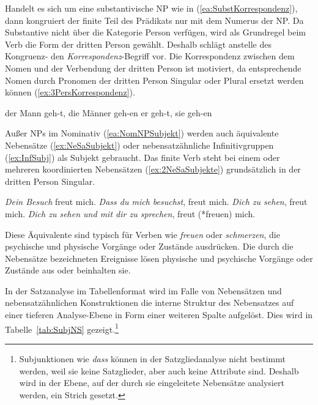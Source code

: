 Handelt es sich um eine substantivische NP wie in (\ref{ea:SubstKorrespondenz}), dann kongruiert der finite Teil des Prädikats nur mit dem Numerus der NP. Da Substantive nicht über die Kategorie Person verfügen, wird als Grundregel beim Verb die Form der dritten Person gewählt. Deshalb schlägt \citet[312]{Eisenberg2020_Satz} anstelle des Kongruenz- den \textit{Korrespondenz}-Begriff vor. Die Korrespondenz zwischen dem Nomen und der Verbendung der dritten Person ist motiviert, da entsprechende Nomen durch Pronomen der dritten Person Singular oder Plural ersetzt werden können (\ref{ex:3PersKorrespondenz}). 

\ea \label{ea:SubjPrädkorrespondenz}
\ea \label{ea:SubstKorrespondenz} der Mann geh-t, die Männer geh-en
\ex \label{ex:3PersKorrespondenz} er geh-t, sie geh-en
\z 
\z 

Außer NPs im Nominativ (\ref{ea:NomNPSubjekt}) werden auch äquivalente Nebensätze (\ref{ex:NeSaSubjekt}) oder nebensatzähnliche Infinitivgruppen (\ref{ex:InfSubj}) als Subjekt gebraucht. Das finite Verb steht bei einem oder mehreren koordinierten Nebensätzen (\ref{ex:2NeSaSubjekte}) grundsätzlich in der dritten Person Singular.  

\ea \label{ea:Subjektäquivalente}
\ea \label{ea:NomNPSubjekt} \textit{Dein Besuch} freut mich.
\ex \label{ex:NeSaSubjekt} \textit{Dass du mich besuchst}, freut mich.
\ex \label{ex:InfSubj} \textit{Dich zu sehen}, freut mich.
\ex \label{ex:2NeSaSubjekte} \textit{Dich zu sehen und mit dir zu sprechen}, freut (*freuen) mich.    
\z 
\z 

Diese Äquivalente sind typisch für Verben wie \textit{freuen} oder \textit{schmerzen}, die psychische und physische Vorgänge oder Zustände ausdrücken. Die durch die Nebensätze bezeichneten Ereignisse lösen physische und psychische Vorgänge oder Zustände aus oder beinhalten sie.  

In der Satzanalyse im Tabellenformat wird im Falle von Nebensätzen und nebensatzähnlichen Konstruktionen die interne Struktur des Nebensatzes auf einer tieferen Analyse-Ebene in Form einer weiteren Spalte aufgelöst. Dies wird in Tabelle~\ref{tab:SubjNS} gezeigt.\footnote{Subjunktionen wie \textit{dass} können in der Satzgliedanalyse nicht bestimmt werden, weil sie keine Satzglieder, aber auch keine Attribute sind. Deshalb wird in der Ebene, auf der durch sie eingeleitete Nebensätze analysiert werden, ein Strich gesetzt.} 


